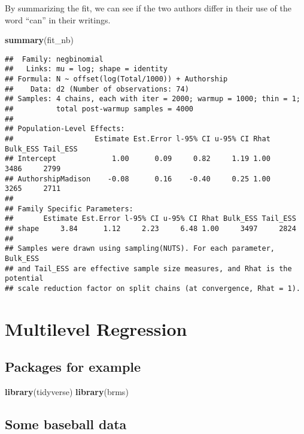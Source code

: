 \documentclass[
]{book}
\newenvironment{Shaded}{\begin{snugshade}}{\end{snugshade}}
\newcommand{\KeywordTok}[1]{\textcolor[rgb]{0.13,0.29,0.53}{\textbf{#1}}}
\newcommand{\NormalTok}[1]{#1}
\begin{document}
By summarizing the fit, we can see if the two authors differ in their use of the word ``can'' in their writings.

\begin{Shaded}
\begin{Highlighting}[]
\KeywordTok{summary}\NormalTok{(fit_nb)}
\end{Highlighting}
\end{Shaded}

\begin{verbatim}
##  Family: negbinomial 
##   Links: mu = log; shape = identity 
## Formula: N ~ offset(log(Total/1000)) + Authorship 
##    Data: d2 (Number of observations: 74) 
## Samples: 4 chains, each with iter = 2000; warmup = 1000; thin = 1;
##          total post-warmup samples = 4000
## 
## Population-Level Effects: 
##                   Estimate Est.Error l-95% CI u-95% CI Rhat Bulk_ESS Tail_ESS
## Intercept             1.00      0.09     0.82     1.19 1.00     3486     2799
## AuthorshipMadison    -0.08      0.16    -0.40     0.25 1.00     3265     2711
## 
## Family Specific Parameters: 
##       Estimate Est.Error l-95% CI u-95% CI Rhat Bulk_ESS Tail_ESS
## shape     3.84      1.12     2.23     6.48 1.00     3497     2824
## 
## Samples were drawn using sampling(NUTS). For each parameter, Bulk_ESS
## and Tail_ESS are effective sample size measures, and Rhat is the potential
## scale reduction factor on split chains (at convergence, Rhat = 1).
\end{verbatim}

\hypertarget{multilevel-regression}{%
\chapter{Multilevel Regression}\label{multilevel-regression}}

\hypertarget{packages-for-example}{%
\section{Packages for example}\label{packages-for-example}}

\begin{Shaded}
\begin{Highlighting}[]
\KeywordTok{library}\NormalTok{(tidyverse)}
\KeywordTok{library}\NormalTok{(brms)}
\end{Highlighting}
\end{Shaded}

\hypertarget{some-baseball-data}{%
\section{Some baseball data}\label{some-baseball-data}}
\end{document}
